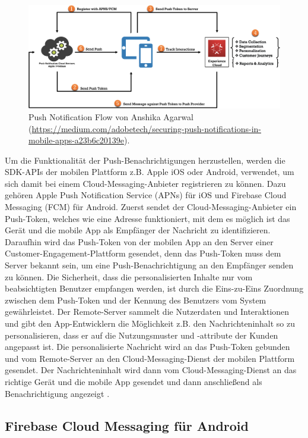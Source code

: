 \documentclass[sigconf]{acmart}
\begin{document}
\begin{figure}[h]
  \centering
  \includegraphics[width=\linewidth]{sample-flow}
  \caption{Push Notification Flow von Anshika Agarwal (\url{https://medium.com/adobetech/securing-push-notifications-in-mobile-apps-a23b6c20139e}).}
\end{figure}

Um die Funktionalität der Push-Benachrichtigungen herzustellen, 
werden die SDK-APIs der mobilen Plattform z.B. Apple iOS oder Android, 
verwendet, um sich damit bei einem Cloud-Messaging-Anbieter 
registrieren zu können. Dazu gehören Apple Push Notification Service 
(APNs) für iOS und Firebase Cloud Messaging (FCM) für Android.
Zuerst sendet der Cloud-Messaging-Anbieter ein Push-Token, welches wie 
eine Adresse funktioniert, mit dem es möglich ist das Gerät und die 
mobile App als Empfänger der Nachricht zu identifizieren.
Daraufhin wird das Push-Token von der mobilen App an den Server einer 
Customer-Engagement-Plattform gesendet, denn das Push-Token muss dem 
Server bekannt sein, um eine Push-Benachrichtigung an den Empfänger 
senden zu können.
Die Sicherheit, dass die personalisierten Inhalte nur vom 
beabsichtigten Benutzer empfangen werden, ist durch die Eins-zu-Eins 
Zuordnung zwischen dem Push-Token und der Kennung des Benutzers vom 
System gewährleistet.
Der Remote-Server sammelt die Nutzerdaten und Interaktionen und gibt 
den App-Entwicklern die Möglichkeit z.B. den Nachrichteninhalt so zu 
personalisieren, dass er auf die Nutzungsmuster und -attribute der 
Kunden angepasst ist.
Die personalisierte Nachricht wird an das Push-Token gebunden und 
vom Remote-Server an den Cloud-Messaging-Dienst der mobilen 
Plattform gesendet.
Der Nachrichteninhalt wird dann vom Cloud-Messaging-Dienst an das 
richtige Gerät und die mobile App gesendet und dann anschließend als 
Benachrichtigung angezeigt \cite{agarwal}.

\subsection{Firebase Cloud Messaging für Android}
\end{document}
